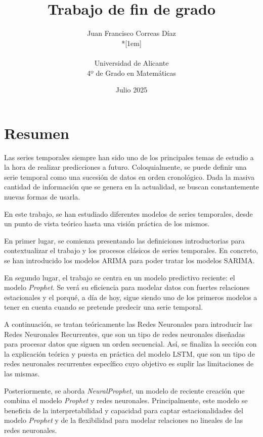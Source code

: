 \documentclass[12pt,twoside]{article}
\title{Trabajo de fin de grado}
\author{Juan Francisco Correas Díaz \\*[1em]
\begin{minipage}{0.75\textwidth}
\footnotesize \itshape
\begin{center}
Universidad de Alicante \\
4º de Grado en Matemáticas
\end{center}
\end{minipage}
}
\date{Julio 2025}
\begin{document}


\newpage



\section*{Resumen}

Las series temporales siempre han sido uno de los principales temas de estudio a la hora de realizar predicciones a futuro. Coloquialmente, se puede definir una serie temporal como una sucesión de datos en orden cronológico. Dada la masiva cantidad de información que se genera en la actualidad, se buscan constantemente nuevas formas de usarla.

En este trabajo, se han estudiado diferentes modelos de series temporales, desde un punto de vista teórico hasta una visión práctica de los mismos.

En primer lugar, se comienza presentando las definiciones introductorias para contextualizar el trabajo y los procesos clásicos de series temporales. En concreto, se han introducido  los modelos ARIMA para poder tratar los modelos SARIMA.

En segundo lugar, el trabajo se centra en un modelo predictivo reciente: el modelo \textit{Prophet}. Se verá su eficiencia para modelar datos con fuertes relaciones estacionales y el porqué, a día de hoy, sigue siendo uno de los primeros modelos a tener en cuenta cuando se pretende predecir una serie temporal.

A continuación, se tratan teóricamente las Redes Neuronales para introducir las Redes Neuronales Recurrentes, que son un tipo de redes neuronales diseñadas para procesar datos que siguen un orden secuencial. Así, se finaliza la sección con la explicación teórica y puesta en práctica del modelo LSTM, que son un tipo de redes neuronales recurrentes específico cuyo objetivo es suplir las limitaciones de las mismas. 

Posteriormente, se aborda \textit{NeuralProphet}, un modelo de reciente creación que combina el modelo \textit{Prophet} y redes neuronales. Principalmente, este modelo se beneficia de la interpretabilidad y capacidad para captar estacionalidades del modelo \textit{Prophet} y de la flexibilidad para modelar relaciones no lineales de las redes neuronales.
\end{document}
